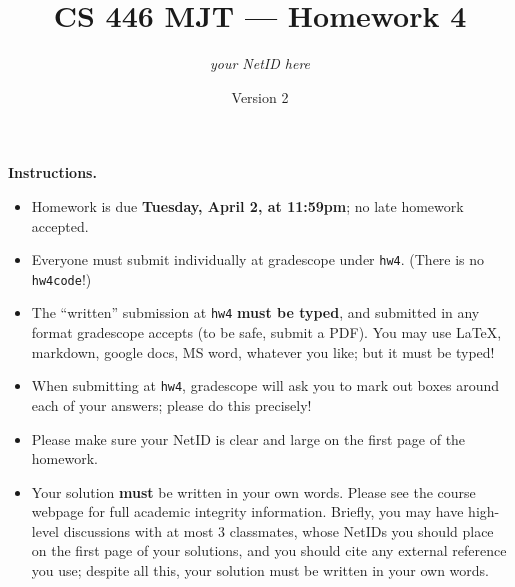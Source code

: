 \documentclass{article}
\title{CS 446 MJT --- Homework 4}
\author{\emph{your NetID here}}
\date{Version 2}
\theoremstyle{definition}
\theoremstyle{remark}
\begin{document}
\maketitle

\textbf{Instructions.}
\begin{itemize}
    \item
    Homework is due \textbf{Tuesday, April 2, at 11:59pm}; no late homework accepted.

    \item
    Everyone must submit individually at gradescope under \texttt{hw4}.
    (There is no \texttt{hw4code}!)

    \item
    The ``written'' submission at \texttt{hw4} \textbf{must be typed}, and submitted in
    any format gradescope accepts (to be safe, submit a PDF).  You may use \LaTeX, markdown,
    google docs, MS word, whatever you like; but it must be typed!

    \item
    When submitting at \texttt{hw4}, gradescope will ask you to mark out boxes
    around each of your answers; please do this precisely!

    \item
    Please make sure your NetID is clear and large on the first page of the homework.

    \item
    Your solution \textbf{must} be written in your own words.
    Please see the course webpage for full academic integrity information.
    Briefly, you may have high-level discussions with at most 3 classmates,
    whose NetIDs you should place on the first page of your solutions,
    and you should cite any external reference you use; despite all this,
    your solution must be written in your own words.

\end{itemize}
\end{document}
